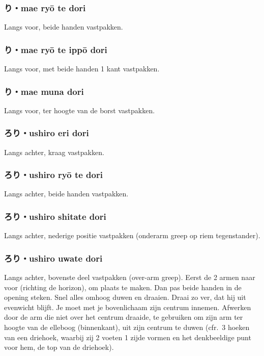 \subsubsection{り・mae ry\={o} te dori}
Langs voor, beide handen vastpakken.

\subsubsection{り・mae ry\={o} te ipp\={o} dori}
Langs voor, met beide handen 1 kant vastpakken.

\subsubsection{り・mae muna dori}
Langs voor, ter hoogte van de borst vastpakken.

\subsubsection{ろり・ushiro eri dori}
Langs achter, kraag vastpakken.

\subsubsection{ろり・ushiro ry\={o} te dori}
Langs achter, beide handen vastpakken.

\subsubsection{ろり・ushiro shitate dori}
Langs achter, nederige positie vastpakken (onderarm greep op riem tegenstander).

\subsubsection{ろり・ushiro uwate dori}
Langs achter, bovenste deel vastpakken (over-arm greep). Eerst de 2 armen naar voor (richting de horizon), om plaats te maken. Dan pas beide handen in de opening steken. Snel alles omhoog duwen en draaien. Draai zo ver, dat hij uit evenwicht blijft. Je moet met je bovenlichaam zijn centrum innemen. Afwerken door de arm die niet over het centrum draaide, te gebruiken om zijn arm ter hoogte van de elleboog (binnenkant), uit zijn centrum te duwen (cfr.\ 3 hoeken van een driehoek, waarbij zij 2 voeten 1 zijde vormen en het denkbeeldige punt voor hem, de top van de driehoek).

